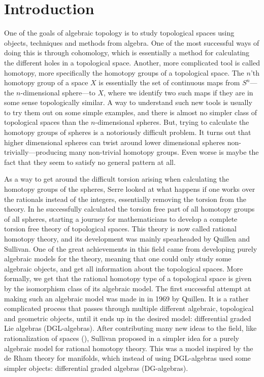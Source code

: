 


\section{Introduction}

One of the goals of algebraic topology is to study topological spaces using objects, techniques and methods from algebra. One of the most successful ways of doing this is through cohomology, which is essentially a method for calculating the different holes in a topological space. Another, more complicated tool is called homotopy, more specifically the homotopy groups of a topological space. The $n$'th homotopy group of a space $X$ is essentially the set of continuous maps from $S^n$---the $n$-dimensional sphere---to $X$, where we identify two such maps if they are in some sense topologically similar. A way to understand such new tools is usually to try them out on some simple examples, and there is almost no simpler class of topological spaces than the $n$-dimensional spheres. But, trying to calculate the homotopy groups of spheres is a notoriously difficult problem. It turns out that higher dimensional spheres can twist around lower dimensional spheres non-trivially---producing many non-trivial homotopy groups. Even worse is maybe the fact that they seem to satisfy no general pattern at all. 

As a way to get around the difficult torsion arising when calculating the homotopy groups of the spheres, Serre looked at what happens if one works over the rationals instead of the integers, essentially removing the torsion from the theory. In \cite{Serre} he successfully calculated the torsion free part of all homotopy groups of all spheres, starting a journey for mathematicians to develop a complete torsion free theory of topological spaces. This theory is now called rational homotopy theory, and its development was mainly spearheaded by Quillen and Sullivan. One of the great achievements in this field came from developing purely algebraic models for the theory, meaning that one could only study some algebraic objects, and get all information about the topological spaces. More formally, we get that the rational homotopy type of a topological space is given by the isomorphism class of its algebraic model. The first successful attempt at making such an algebraic model was made in \cite{Quillen} in 1969 by Quillen. It is a rather complicated process that passes through multiple different algebraic, topological and geometric objects, until it ends up in the desired model: differential graded Lie algebras (DGL-algebras). 
After contributing many new ideas to the field, like rationalization of spaces (\cite{MIT}), Sullivan proposed in \cite{Sullivan} a simpler idea for a purely algebraic model for rational homotopy theory. This was a model inspired by the de Rham theory for manifolds, which instead of using DGL-algebras used some simpler objects: differential graded algebras (DG-algebras). 

